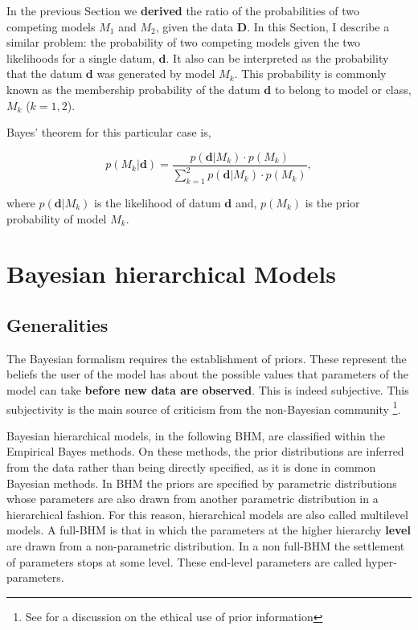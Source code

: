 In the previous Section we \textbf{derived} the ratio of the probabilities of two competing models $M_1$ and $M_2$, given the data $\mathbf{D}$. In this Section, I describe a similar problem: the probability of two competing models given the two likelihoods for a single datum, $\mathbf{d}$. It also can be interpreted as the probability that the datum $\mathbf{d}$ was generated by model $M_k$. This probability is commonly known as the membership probability of the datum $\mathbf{d}$ to belong to model or class, $M_k$ ($k=1,2$). 

Bayes' theorem for this particular case is,

\begin{equation}
\label{eq:prob}
p( M_k | \mathbf{d}) =\frac{p(\mathbf{d}|M_k)\cdot p(M_k)}{\sum_{k=1}^2 p(\mathbf{d}|M_k)\cdot p(M_k)},
\end{equation}

where $p(\mathbf{d}|M_k)$ is the likelihood of datum $\mathbf{d}$ and, $p(M_k)$ is the prior probability of model $M_k$.
\section{Bayesian hierarchical Models}
\label{sect:BHM}
\subsection{Generalities}
The Bayesian formalism requires the establishment of priors. These represent the beliefs the user of the model has about the possible values that parameters of the model can take \textbf{before new data are observed}. This is indeed subjective. This subjectivity is the main source of criticism from the non-Bayesian community \footnote{See \citet{Gelman2012} for a discussion on the ethical use of prior information}. 

Bayesian hierarchical models, in the following BHM, are classified within the Empirical Bayes methods. On these methods, the prior distributions are inferred from the data rather than being directly specified, as it is done in common Bayesian methods. In BHM the priors are specified by parametric distributions whose parameters are also drawn from another parametric distribution in a hierarchical fashion. For this reason, hierarchical models are also called multilevel models. A full-BHM is that in which the parameters at the higher hierarchy \textbf{level} are drawn from a non-parametric distribution. In a non full-BHM the settlement of parameters stops at some level. These end-level parameters are called hyper-parameters.


